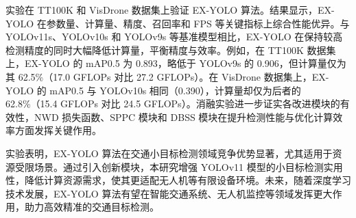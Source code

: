 实验在 TT100K 和 VisDrone 数据集上验证 EX-YOLO 算法。结果显示，EX-YOLO 在参数量、计算量、精度、召回率和 FPS 等关键指标上综合性能优异。与 YOLOv11s、YOLOv10s 和 YOLOv9s 等基准模型相比，EX-YOLO 在保持较高检测精度的同时大幅降低计算量，平衡精度与效率。例如，在 TT100K 数据集上，EX-YOLO 的 mAP0.5 为 0.893，略低于 YOLOv9s 的 0.906，但计算量仅为其 62.5\%（17.0 GFLOPs 对比 27.2 GFLOPs）。在 VisDrone 数据集上，EX-YOLO 的 mAP0.5 与 YOLOv10s 相同（0.390），计算量却仅为后者的 62.8\%（15.4 GFLOPs 对比 24.5 GFLOPs）。消融实验进一步证实各改进模块的有效性，NWD 损失函数、SPPC 模块和 DBSS 模块在提升检测性能与优化计算效率方面发挥关键作用。

实验表明，EX-YOLO 算法在交通小目标检测领域竞争优势显著，尤其适用于资源受限场景。通过引入创新模块，本研究增强 YOLOv11 模型的小目标检测实用性，降低计算资源需求，使其更适配无人机等有限设备环境。未来，随着深度学习技术发展，EX-YOLO 算法有望在智能交通系统、无人机监控等领域发挥更大作用，助力高效精准的交通目标检测。